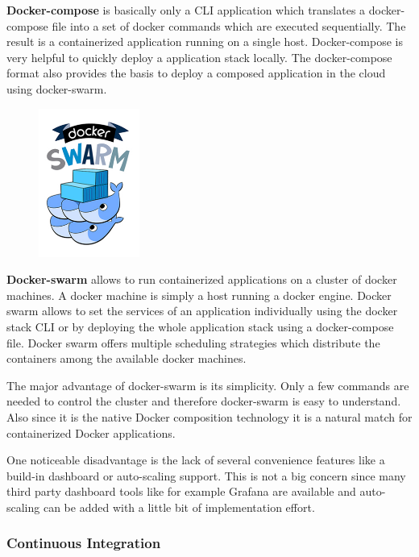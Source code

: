 \textbf{Docker-compose} is basically only a CLI application which translates a
docker-compose file into a set of docker commands which are executed
sequentially. The result is a containerized application running on a single
host. Docker-compose is very helpful to quickly deploy a \ms{} application
stack locally. The docker-compose format also provides the basis to deploy a
composed application in the cloud using docker-swarm.\\

\newpage

\begin{figure}
	\hspace*{0.4cm}
    \includegraphics[width=3.3cm]{images/dependencies/docker-swarm}
\end{figure}

\textbf{Docker-swarm} allows to run containerized applications on a cluster of
docker machines. A docker machine is simply a host running a docker engine. Docker
swarm allows to set the services of an application individually using the docker
stack CLI or by deploying the whole application stack using a docker-compose
file. Docker swarm offers multiple scheduling strategies which distribute the
containers among the available docker machines.

The major advantage of docker-swarm is its simplicity. Only a few commands are
needed to control the cluster and therefore docker-swarm is easy to understand.
Also since it is the native Docker composition technology it is a natural match
for containerized Docker applications.

One noticeable disadvantage is the lack of several convenience features like
a build-in dashboard or auto-scaling support. This is not a big concern
since many third party dashboard tools like for example Grafana are available
and auto-scaling can be added with a little bit of implementation effort. 

\subsubsection{Continuous Integration}

